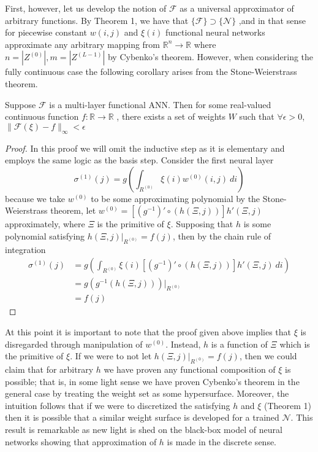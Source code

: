 First, however, let us develop the notion of $\mathcal{F}$ as a universal approximator of arbitrary functions. By Theorem 1, we have that $\{\mathcal{F}\} \supset \{\mathcal{N}\}$ ,and in that sense for piecewise constant $w(i,j)$ and $\xi(i)$ functional neural networks approximate any arbitrary mapping from $\mathbb{R}^n \to \mathbb{R}$ where $n = |Z^{(0)}|, m = |Z^{(L-1)}|$ by Cybenko's theorem. However, when considering the fully continuous case the following corollary arises from the Stone-Weierstrass theorem.
\begin{corollary}
Suppose $\mathcal{F}$  is a multi-layer functional ANN. Then for some real-valued continuous function $f:\mathbb{R} \to \mathbb{R}$ , there exists a set of weights $W$ such that  $\forall \epsilon > 0$, $\|\mathcal{F}(\xi) - f\|_\infty < \epsilon$
\end{corollary}
\begin{proof}
In this proof we will omit the inductive step as it is elementary and employs the same logic as the basis step. Consider the first neural layer
\begin{equation}\sigma^{(1)}(j) = g\left(\int_{R^{(0)}}   \xi(i) w^{(0)}(i,j) \ di\right)\end{equation}
because we take $w^{(0)}$ to be some approximating polynomial by the Stone-Weierstrass theorem, let $w^{(0)} = \left[(g^{-1})' \circ\left(h(\Xi,j)\right)\right]h'(\Xi,j)$ approximately, where $\Xi$ is the primitive of $\xi$. Supposing that $h$ is some polynomial satisfying $h(\Xi,j)\Big|_{R^{(0)}} = f(j)$, then by the chain rule of integration
\begin{equation}
    \begin{aligned}
    \sigma^{(1)}(j) &=g\left(\int_{R^{(0)}}   \xi(i)  \left[(g^{-1})' \circ\left(h(\Xi,j)\right)\right]h'(\Xi,j)\ di\right) \\
    &= g\left(g^{-1}\left(h(\Xi,j)\right)\right)\Bigg|_{R^{(0)}} \\
    &= f(j)
    \end{aligned}
\end{equation}
\end{proof}


At this point it is important to note that the proof given above implies that $\xi$ is disregarded through manipulation of $w^{(0)}$. Instead, $h$ is a function of $\Xi$ which is the primitive of $\xi$. If we were to not let $h(\Xi,j)\Big|_{R^{(0)}} = f(j)$, then we could claim that for arbitrary $h$ we have proven any functional composition of $\xi$ is possible; that is, in some light sense we have proven Cybenko's theorem in the general case by treating the weight set as some hypersurface. Moreover, the intuition follows that if we were to discretized the satisfying $h$ and $\xi$ (Theorem 1) then it is possible that a similar weight surface is developed for a trained $\mathcal{N}$. This result is remarkable as new light is shed on the black-box model of neural networks showing that approximation of $h$ is made in the discrete sense. 



